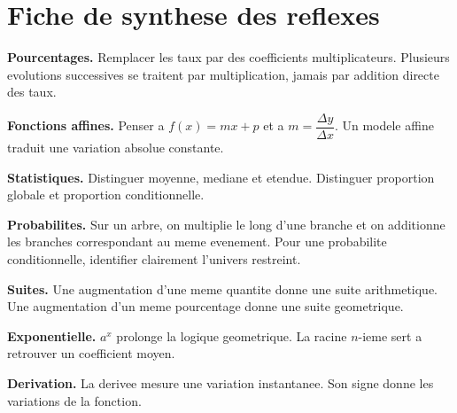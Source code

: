 \documentclass[11pt,a4paper]{article}
\begin{document}
\newpage
\section{Fiche de synthese des reflexes}

\begin{methodebox}
\textbf{Pourcentages.} Remplacer les taux par des coefficients multiplicateurs. Plusieurs evolutions successives se traitent par multiplication, jamais par addition directe des taux.

\textbf{Fonctions affines.} Penser a $f(x)=mx+p$ et a $m=\dfrac{\Delta y}{\Delta x}$. Un modele affine traduit une variation absolue constante.

\textbf{Statistiques.} Distinguer moyenne, mediane et etendue. Distinguer proportion globale et proportion conditionnelle.

\textbf{Probabilites.} Sur un arbre, on multiplie le long d'une branche et on additionne les branches correspondant au meme evenement. Pour une probabilite conditionnelle, identifier clairement l'univers restreint.

\textbf{Suites.} Une augmentation d'une meme quantite donne une suite arithmetique. Une augmentation d'un meme pourcentage donne une suite geometrique.

\textbf{Exponentielle.} $a^x$ prolonge la logique geometrique. La racine $n$-ieme sert a retrouver un coefficient moyen.

\textbf{Derivation.} La derivee mesure une variation instantanee. Son signe donne les variations de la fonction.
\end{methodebox}
\end{document}

